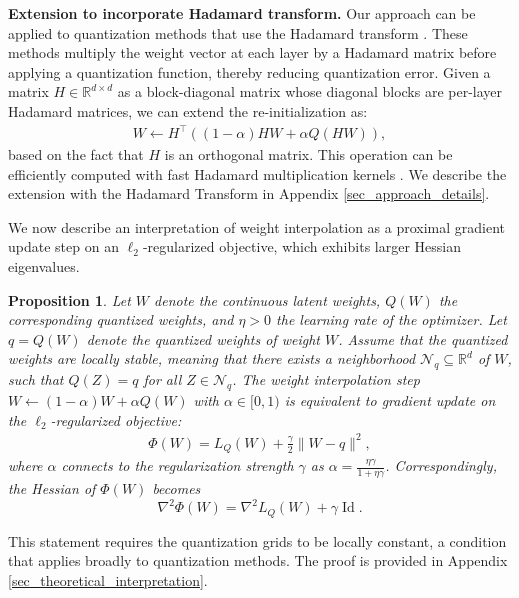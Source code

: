 \documentclass{article}
\newtheorem{proposition}[theorem]{Proposition}
\theoremstyle{definition}
\DeclareMathOperator{\id}{Id}
\newcommand{\real}{\mathbb{R}}
\begin{document}
\textbf{Extension to incorporate Hadamard transform.} Our approach can be applied to quantization methods that use the Hadamard transform \citep{panferov2025quest}. These methods multiply the weight vector at each layer by a Hadamard matrix before applying a quantization function, thereby reducing quantization error. Given a matrix $H \in \real^{d\times d}$ as a block-diagonal matrix whose diagonal blocks are per-layer Hadamard matrices, we can extend the re-initialization as: 
\begin{align}
    W \leftarrow H^{\top} \left ( (1-\alpha)HW + \alpha Q(HW) \right), 
\end{align}
based on the fact that $H$ is an orthogonal matrix. This operation can be efficiently computed with fast Hadamard multiplication kernels \citep{fast_hadamard_kernel}. We describe the extension with the Hadamard Transform in Appendix \ref{sec_approach_details}. 

We now describe an interpretation of weight interpolation as a proximal gradient update step on an $\ell_2$-regularized objective, which exhibits larger Hessian eigenvalues. 

\begin{proposition}\label{prop_connect}
Let $W$ denote the continuous latent weights, $Q(W)$ the corresponding quantized weights, and $\eta > 0$ the learning rate of the optimizer.
Let $q = Q(W)$ denote the quantized weights of weight $W$. Assume that the quantized weights are locally stable, meaning that there exists a neighborhood $\mathcal{N}_q \subseteq \mathbb{R}^d$ of $W$, such that $Q(Z)=q$ for all $Z \in \mathcal{N}_q$.
The weight interpolation step $W \leftarrow (1-\alpha)W + \alpha Q(W)$ with $\alpha \in [0, 1)$ is equivalent to gradient update on the $\ell_2$-regularized objective:
\begin{align}
    \Phi(W) = L_Q(W) + \frac{\gamma}{2} \|W - q\|^2,
\end{align}
where $\alpha$ connects to the regularization strength $\gamma$ as $\alpha = \frac{\eta \gamma}{1 + \eta \gamma}$. Correspondingly, the Hessian of $\Phi(W)$ becomes \[ \nabla^2 \Phi(W) = \nabla^2 L_Q(W) + \gamma \id. \]
\end{proposition}
This statement requires the quantization grids to be locally constant, a condition that applies broadly to quantization methods. The proof is provided in Appendix \ref{sec_theoretical_interpretation}. 
\end{document}
